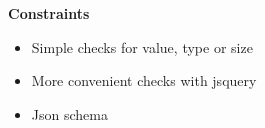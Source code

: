 \documentclass[usenames,dvipsnames, 18pt, compress, aspectratio=169]{beamer}
\begin{document}
\begin{frame}
    \frametitle{}
    \begin{center}
    \textbf{Constraints}

        \begin{itemize}[label={\MVRightarrow}]
            \item Simple checks for value, type or size
            \item More convenient checks with jsquery
            \item Json schema
        \end{itemize}

    \end{center}
\end{frame}

\end{document}
